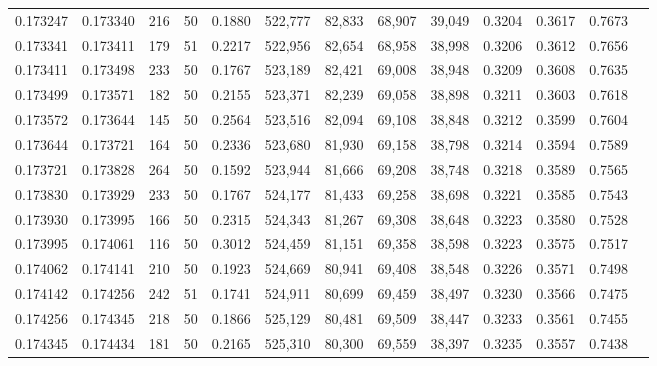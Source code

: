\begin{tabular}{rrrrrrrrrrrrr}
0.173247 & 0.173340 &   216 &  50 &                                     0.1880 & 522,777 &  82,833 &  68,907 &  39,049 & 0.3204 & 0.3617 & 0.7673 \\
0.173341 & 0.173411 &   179 &  51 &                                     0.2217 & 522,956 &  82,654 &  68,958 &  38,998 & 0.3206 & 0.3612 & 0.7656 \\
0.173411 & 0.173498 &   233 &  50 &                                     0.1767 & 523,189 &  82,421 &  69,008 &  38,948 & 0.3209 & 0.3608 & 0.7635 \\
0.173499 & 0.173571 &   182 &  50 &                                     0.2155 & 523,371 &  82,239 &  69,058 &  38,898 & 0.3211 & 0.3603 & 0.7618 \\
0.173572 & 0.173644 &   145 &  50 &                                     0.2564 & 523,516 &  82,094 &  69,108 &  38,848 & 0.3212 & 0.3599 & 0.7604 \\
0.173644 & 0.173721 &   164 &  50 &                                     0.2336 & 523,680 &  81,930 &  69,158 &  38,798 & 0.3214 & 0.3594 & 0.7589 \\
0.173721 & 0.173828 &   264 &  50 &                                     0.1592 & 523,944 &  81,666 &  69,208 &  38,748 & 0.3218 & 0.3589 & 0.7565 \\
0.173830 & 0.173929 &   233 &  50 &                                     0.1767 & 524,177 &  81,433 &  69,258 &  38,698 & 0.3221 & 0.3585 & 0.7543 \\
0.173930 & 0.173995 &   166 &  50 &                                     0.2315 & 524,343 &  81,267 &  69,308 &  38,648 & 0.3223 & 0.3580 & 0.7528 \\
0.173995 & 0.174061 &   116 &  50 &                                     0.3012 & 524,459 &  81,151 &  69,358 &  38,598 & 0.3223 & 0.3575 & 0.7517 \\
0.174062 & 0.174141 &   210 &  50 &                                     0.1923 & 524,669 &  80,941 &  69,408 &  38,548 & 0.3226 & 0.3571 & 0.7498 \\
0.174142 & 0.174256 &   242 &  51 &                                     0.1741 & 524,911 &  80,699 &  69,459 &  38,497 & 0.3230 & 0.3566 & 0.7475 \\
0.174256 & 0.174345 &   218 &  50 &                                     0.1866 & 525,129 &  80,481 &  69,509 &  38,447 & 0.3233 & 0.3561 & 0.7455 \\
0.174345 & 0.174434 &   181 &  50 &                                     0.2165 & 525,310 &  80,300 &  69,559 &  38,397 & 0.3235 & 0.3557 & 0.7438 \\

\end{tabular}
